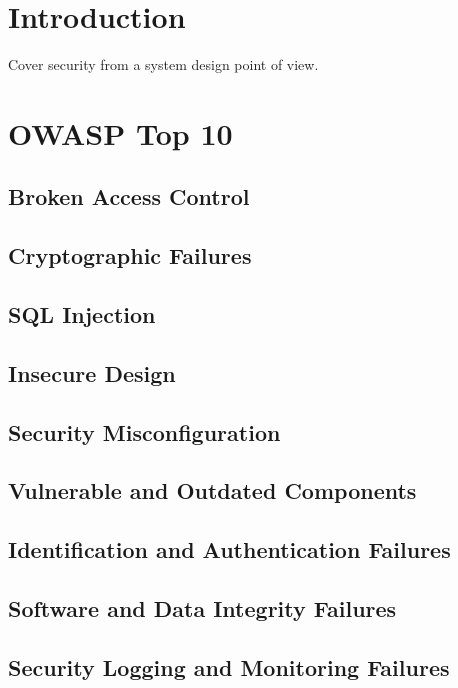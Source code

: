 \documentclass[a4paper, 11pt]{book}
\begin{document}
{    \section{Introduction}
    Cover security from a system design point of view.


    \section{OWASP Top 10}

    \subsection{Broken Access Control}

    \subsection{Cryptographic Failures}

    \subsection{SQL Injection}

    \subsection{Insecure Design}

    \subsection{Security Misconfiguration}

    \subsection{Vulnerable and Outdated Components}

    \subsection{Identification and Authentication Failures}

    \subsection{Software and Data Integrity Failures}

    \subsection{Security Logging and Monitoring Failures}

}
\end{document}
